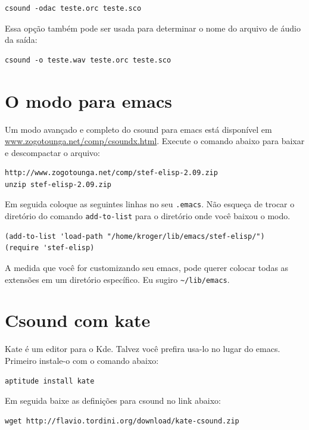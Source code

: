 \documentclass[12pt,brazil]{book}
\begin{document}
\begin{verbatim}
csound -odac teste.orc teste.sco
\end{verbatim}

Essa opção também pode ser usada para determinar o nome do arquivo de
áudio da saída:

\begin{verbatim}
csound -o teste.wav teste.orc teste.sco
\end{verbatim}

\section{O modo para emacs}
\label{sec:o-modo-para}

Um modo avançado e completo do csound para emacs está disponível em
\url{www.zogotounga.net/comp/csoundx.html}. Execute o comando abaixo
para baixar e descompactar o arquivo:

\begin{verbatim}
http://www.zogotounga.net/comp/stef-elisp-2.09.zip
unzip stef-elisp-2.09.zip
\end{verbatim}

Em seguida coloque as seguintes linhas no seu \texttt{.emacs}. Não
esqueça de trocar o diretório do comando \texttt{add-to-list} para o
diretório onde você baixou o modo.

\begin{verbatim}
(add-to-list 'load-path "/home/kroger/lib/emacs/stef-elisp/")
(require 'stef-elisp)
\end{verbatim}

A medida que você for customizando seu emacs, pode querer colocar
todas as extensões em um diretório específico. Eu sugiro
\verb|~/lib/emacs|.

\section{Csound com kate}
\label{sec:csound-com-kate}

Kate é um editor para o Kde. Talvez você prefira usa-lo no lugar do
emacs. Primeiro instale-o com o comando abaixo:

\begin{verbatim}
aptitude install kate
\end{verbatim}

Em seguida baixe as definições para csound no link abaixo:

\begin{verbatim}
wget http://flavio.tordini.org/download/kate-csound.zip
\end{verbatim}
\end{document}
